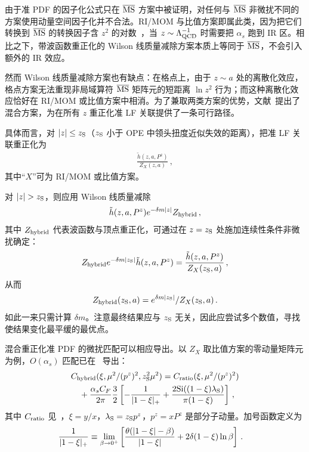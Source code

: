 由于准 PDF 的因子化公式只在 ${\overline{\rm MS}}$ 方案中被证明，对任何与 ${\overline{\rm MS}}$ 非微扰不同的方案使用动量空间因子化并不合法。RI/MOM 与比值方案即属此类，因为把它们转换到 ${\overline{\rm MS}}$ 的转换因子含 $z^2$ 的对数~\cite{Constantinou:2017sej,Izubuchi:2018srq}，当 $z\sim \Lambda_{\rm QCD}^{-1}$ 时需要把 $\alpha_s$ 跑到 IR 区。相比之下，带波函数重正化的 Wilson 线质量减除方案本质上等同于 ${\overline{\rm MS}}$，不会引入额外的 IR 效应。

然而 Wilson 线质量减除方案也有缺点：在格点上，由于 $z\sim a$ 处的离散化效应，格点方案无法重现非局域算符 ${\overline{\rm MS}}$ 矩阵元的短距离 $\ln z^2$ 行为；而这种离散化效应恰好在 RI/MOM 或比值方案中相消。为了兼取两类方案的优势，文献~\cite{Ji:2020brr}提出了混合方案，为在所有 $z$ 重正化准 LF 关联提供了一条可行路径。


具体而言，对 $|z|\le z_{\rm S}$（$z_{\rm S}$ 小于 OPE 中领头扭度近似失效的距离），把准 LF 关联重正化为
\begin{align}\label{eq:ratio2}
	\frac{\tilde h(z,a,P^z)}{Z_X(z,a)}\,,
\end{align}
其中``$X$''可为 RI/MOM 或比值方案。

对 $|z|>z_{\rm S}$，则应用 Wilson 线质量减除
\begin{align}
	{\tilde h(z,a,P^z)}e^{-\delta m |z|}Z_{\rm hybrid}\,,
\end{align}
其中 $Z_{\rm hybrid}$ 代表波函数与顶点重正化，可通过在 $z=z_{\rm S}$ 处施加连续性条件非微扰确定：
\begin{align}
	Z_{\rm hybrid} e^{-\delta m |z_{\rm S}|}{\tilde h(z,a,P^z)}  = \frac{{\tilde h(z,a,P^z)}}{Z_X(z_{\rm S},a) }\,,
\end{align}
从而
\begin{align}
	Z_{\rm hybrid}(z_{\rm S},a) = e^{\delta m |z_{\rm S}|}/{Z_X(z_{\rm S},a)  }\,.
\end{align}
如此一来只需计算 $\delta m$。注意最终结果应与 $z_{\rm S}$ 无关，因此应尝试多个数值，寻找使结果变化最平缓的最优点。

混合重正化准 PDF 的微扰匹配可以相应导出。以 $Z_X$ 取比值方案的零动量矩阵元为例，$O(\alpha_s)$ 匹配已在~\cite{Ji:2020brr} 导出：
\begin{align}\label{eq:hybridm2}
	&C_{\rm hybrid}(\xi, \mu^2/(p^z)^2, z_{\rm S}^2\mu^2) = C_{\rm ratio}(\xi, \mu^2/(p^z)^2) \nonumber\\
	&\quad+{\alpha_sC_F\over 2\pi}{3\over 2} \left[-{1\over |1-\xi|_+}+ \frac{2 \text{Si}((1-\xi) \lambda_{\rm S})}{\pi  (1-\xi)} \right]\,,
\end{align}
其中 $C_{\rm ratio}$ 见~\cite{Izubuchi:2018srq}，$\xi=y/x$，$\lambda_{\rm S}=z_{\rm S}p^z$，$p^z=xP^z$ 是部分子动量。加号函数定义为
\begin{align}
	{1\over |1-\xi|_+} &\equiv \lim_{\beta\to0^+}\left[ {\theta(|1-\xi|-\beta)\over |1-\xi|} + 2\delta(1-\xi)\ln\beta\right] \,.
\end{align}

